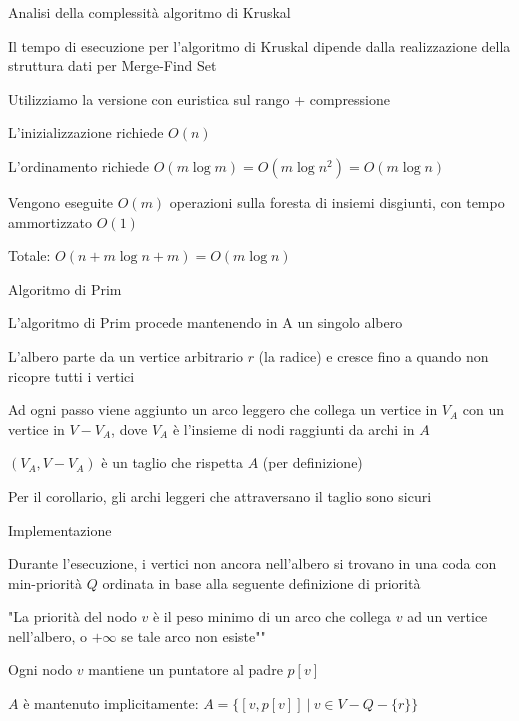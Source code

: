\begin{frame}{Analisi della complessità algoritmo di Kruskal}

\BIL
\item Il tempo di esecuzione per l’algoritmo di Kruskal dipende dalla realizzazione della struttura dati per Merge-Find Set
\item Utilizziamo la versione con \alert{euristica sul rango + compressione}
\BI
\item L’inizializzazione richiede $O(n)$
\item L'ordinamento richiede $O(m \log m) = O(m \log n^2) = O(m \log n)$
\item Vengono eseguite $O(m)$ operazioni sulla foresta di insiemi disgiunti, con tempo ammortizzato $O(1)$
\EI
\item Totale:  $O(n + m \log n + m) = O(m \log n)$
\EIL
\end{frame}

\begin{frame}{Algoritmo di Prim}

\BIL
\item L’algoritmo di Prim procede mantenendo in A un singolo albero 
\item L’albero parte da un vertice arbitrario $r$ (la radice) e cresce fino a quando non ricopre tutti i vertici
\item Ad ogni passo viene aggiunto un arco leggero che collega un vertice in $V_A$ con un vertice in $V-V_A$,
dove $V_A$ è l'insieme di nodi raggiunti da archi in $A$
\EIL

\BIL
\item $(V_A,V-V_A)$ è un taglio che rispetta $A$ (per definizione)
\item Per il corollario, gli archi leggeri che attraversano il taglio sono sicuri
\EIL

\end{frame}

\begin{frame}{Implementazione}
	
\BI
\item Durante l'esecuzione, i vertici non ancora nell'albero si trovano in una 
coda con min-priorità $Q$ ordinata in base alla seguente definizione di priorità
\item "La priorità del nodo $v$ è il peso minimo di un arco che collega $v$ ad
un vertice nell'albero, o $+\infty$ se tale arco non esiste""
\EI

\bigskip
{}
\BI
\item Ogni nodo $v$ mantiene un puntatore al padre $p[v]$
\item $A$ è mantenuto implicitamente: $A = \{ [v, p[v]] ~|~ v \in V - Q - \{ r \} \}$
\EI
\end{frame}



